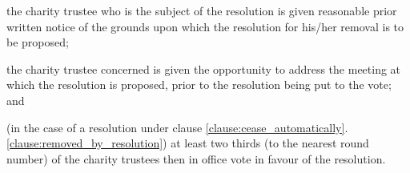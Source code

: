 ﻿\documentclass[a4paper,11pt,onecolumn ]{article}
\begin{document}
\begin{legal}
    \begin{legal}
        \item the charity trustee who is the subject of the resolution is given reasonable prior written notice of the grounds upon which the resolution for his/her removal is to be proposed;
        \item the charity trustee concerned is given the opportunity to address the meeting at which the resolution is proposed, prior to the resolution being put to the vote; and
        \item (in the case of a resolution under clause \ref{clause:cease_automatically}.\ref{clause:removed_by_resolution}) at least two thirds (to the nearest round number) of the charity trustees then in office vote in favour of the resolution.
    \end{legal}
\end{legal}
\end{document}
